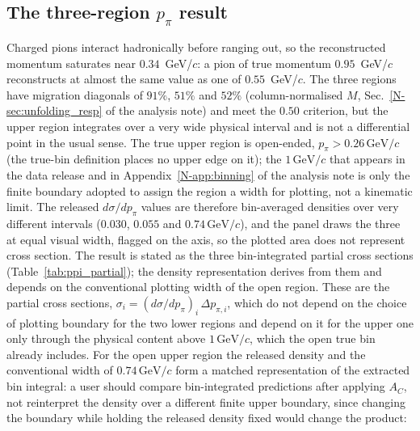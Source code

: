 \documentclass[11pt,a4paper]{article}
\newcommand{\GeVc}{\,\text{GeV}\!/c}
\newcommand{\noteref}[2]{#1~\ref{N-#2} of the analysis note}
\begin{document}
\subsection{The three-region \texorpdfstring{$p_\pi$}{p pi} result}
Charged pions interact hadronically before ranging out, so the reconstructed momentum
saturates near $0.34$~GeV/$c$: a pion of true momentum $0.95$~GeV/$c$ reconstructs at
almost the same value as one of $0.55$~GeV/$c$. The three regions have migration diagonals
of $91\%$, $51\%$ and $52\%$ (column-normalised $M$, \noteref{Sec.}{sec:unfolding_resp}) and
meet the $0.50$ criterion, but the upper region integrates over a very wide physical interval
and is not a differential point in the usual sense. The true upper region is open-ended,
$p_\pi>0.26\GeVc$ (the true-bin definition places no upper edge on it); the $1\GeVc$ that
appears in the data release and in \noteref{Appendix}{app:binning} is only the finite boundary
adopted to assign the region a width for plotting, not a kinematic limit. The released
$d\sigma/dp_\pi$ values are therefore bin-averaged densities over very different intervals
($0.030$, $0.055$ and $0.74\GeVc$), and the panel draws the three at equal visual width,
flagged on the axis, so the plotted area does not represent cross section. The result is
stated as the three bin-integrated partial cross sections
(Table~\ref{tab:ppi_partial}); the density representation derives from them and depends on
the conventional plotting width of the open region. These are the partial cross sections,
$\sigma_i=(d\sigma/dp_\pi)_i\,\Delta p_{\pi,i}$, which do not depend on the choice of plotting
boundary for the two lower regions and depend on it for the upper one only through the
physical content above $1\GeVc$, which the open true bin already includes. For the open upper
region the released density and the conventional width of $0.74\GeVc$ form a matched
representation of the extracted bin integral: a user should compare bin-integrated predictions
after applying $A_C$, not reinterpret the density over a different finite upper boundary, since
changing the boundary while holding the released density fixed would change the product:
\end{document}
